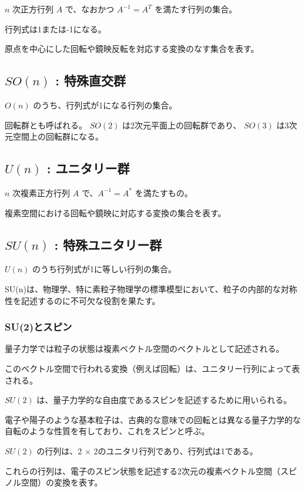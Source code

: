 \documentclass[uplatex,a4j,12pt,dvipdfmx]{jsarticle}
\begin{document}
$n$ 次正方行列 $A$ で、なおかつ $A^{-1} = A^{T}$ を満たす行列の集合。

行列式は1または-1になる。

原点を中心にした回転や鏡映反転を対応する変換のなす集合を表す。

\subsection{$SO(n)$ : 特殊直交群}

$O(n)$ のうち、行列式が1になる行列の集合。

回転群とも呼ばれる。
$SO(2)$ は2次元平面上の回転群であり、
$SO(3)$ は3次元空間上の回転群になる。

\subsection{$U(n)$ : ユニタリー群}

$n$ 次複素正方行列 $A$ で、$A^{-1} = A^{*}$ を満たすもの。

複素空間における回転や鏡映に対応する変換の集合を表す。

\subsection{$SU(n)$ : 特殊ユニタリー群}

$U(n)$ のうち行列式が1に等しい行列の集合。

SU(n)は、物理学、特に素粒子物理学の標準模型において、粒子の内部的な対称性を記述するのに不可欠な役割を果たす。

\subsubsection{SU(2)とスピン}

量子力学では粒子の状態は複素ベクトル空間のベクトルとして記述される。

このベクトル空間で行われる変換（例えば回転）は、ユニタリー行列によって表される。

$SU(2)$ は、量子力学的な自由度であるスピンを記述するために用いられる。

電子や陽子のような基本粒子は、古典的な意味での回転とは異なる量子力学的な自転のような性質を有しており、これをスピンと呼ぶ。

$SU(2)$ の行列は、2 $\times$ 2のユニタリ行列であり、行列式は1である。

これらの行列は、電子のスピン状態を記述する2次元の複素ベクトル空間（スピノル空間）の変換を表す。
\end{document}
